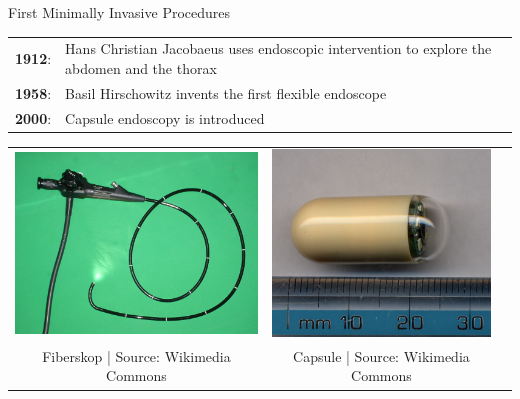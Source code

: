 \begin{frame}{First Minimally Invasive Procedures}

	\begin{tabular}{lp{28em}}
		\textbf{1912}: & Hans Christian Jacobaeus uses endoscopic intervention to explore the abdomen and the thorax \\
		\textbf{1958}: & Basil Hirschowitz invents the first flexible endoscope                                      \\
		\textbf{2000}: & Capsule endoscopy is introduced
	\end{tabular}

	\begin{center}
		\begin{tabular}{c c c}
			\includegraphics[height=.45\textheight ]{images/flexible} &
			\includegraphics[height=.45\textheight ]{images/capsule}    \\
			\scriptsize Fiberskop | Source: Wikimedia Commons         &
			\scriptsize Capsule | Source: Wikimedia Commons
		\end{tabular}
	\end{center}

\end{frame}



